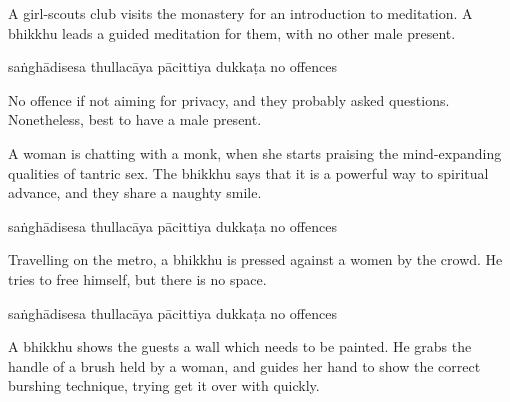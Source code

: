 \begin{exam}{\autoExamName}
\begin{problem*}
\begin{parts}
  \item A girl-scouts club visits the monastery for an introduction to
    meditation. A bhikkhu leads a guided meditation for them, with no other male
    present.

    \bigskip

    \begin{answers}{5}
      \bChoices
       saṅghādisesa\eAns
       thullacāya\eAns
       pācittiya\eAns
       dukkaṭa\eAns
       no offences\eAns
      \eChoices
    \end{answers}

    \begin{solution}
      No offence if not aiming for privacy, and they probably asked questions.
      Nonetheless, best to have a male present.
    \end{solution}

    \bigskip

  \item A woman is chatting with a monk, when she starts praising the
    mind-expanding qualities of tantric sex. The bhikkhu says that it is a
    powerful way to spiritual advance, and they share a naughty smile.

    \bigskip

    \begin{answers}{5}
      \bChoices
       saṅghādisesa\eAns
       thullacāya\eAns
       pācittiya\eAns
       dukkaṭa\eAns
       no offences\eAns
      \eChoices
    \end{answers}

    \bigskip

  \item Travelling on the metro, a bhikkhu is pressed against a women by the
    crowd. He tries to free himself, but there is no space.

    \bigskip

    \begin{answers}{5}
      \bChoices
       saṅghādisesa\eAns
       thullacāya\eAns
       pācittiya\eAns
       dukkaṭa\eAns
       no offences\eAns
      \eChoices
    \end{answers}

    \bigskip

  \item A bhikkhu shows the guests a wall which needs to be painted. He grabs the
  handle of a brush held by a woman, and guides her hand to show the correct
  burshing technique, trying get it over with quickly.


\end{parts}
\end{problem*}
\end{exam}
